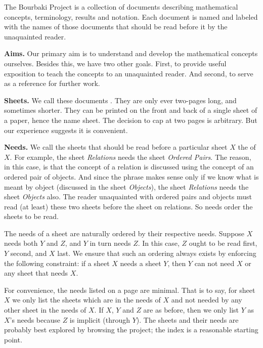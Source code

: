 
\sbasic

\sstart
{}

The Bourbaki Project is a collection
of documents describing mathematical
concepts, terminology, results and
notation. Each document is named and
labeled with the names of those documents
that should be read before it by the
unaquainted reader.

\textbf{Aims.}
Our primary aim is to understand and
develop the mathematical concepts ourselves.
Besides this, we have two other goals.
First, to provide useful exposition to teach
the concepts to an unaquainted reader.
And second, to serve as a reference for
further work.

\textbf{Sheets.}
We call these documents .
They are only ever two-pages long, and
sometimes shorter.
They can be printed on the front
and back of a single
sheet of a paper, hence the name sheet.
The decision to cap at two pages is
arbitrary.
But our
experience suggests it is convenient.


\textbf{Needs.}
We call the sheets that should
be read before a particular sheet
$X$ the  of $X$.
For example, the sheet \textit{Relations}
needs the sheet \textit{Ordered Pairs}.
The reason, in this case, is that the
concept of a relation is discussed using
the concept of an ordered pair of objects.
And since the phrase
 makes sense
only if we know what is meant by object
(discussed in the sheet \textit{Objects}),
the sheet \textit{Relations} needs the sheet
\textit{Objects} also.
The reader unaquainted with
ordered pairs and
objects must read (at least) these two
sheets before the sheet on relations.
So needs order the sheets to be read.

The needs of a sheet are naturally
ordered by their respective needs.
Suppose $X$ needs both $Y$ and $Z$,
and
 $Y$ in turn needs $Z$.
In this case,
$Z$ ought to
be read first, $Y$ second, and $X$ last.
We ensure that such an ordering
always exists by enforcing
the following constraint:
if a
sheet $X$ needs a sheet $Y$,
then $Y$ can not need $X$ or any sheet
that needs $X$.

For convenience, the needs listed on
a page are minimal. That is to say,
for sheet $X$ we only list the sheets
which are in the needs of $X$
and not needed by any other sheet
in the needs of $X$.
If $X$, $Y$ and $Z$ are as before,
then we only list $Y$ as $X$'s needs
because $Z$ is implicit (through $Y$).
The sheets and their needs are probably
best explored by browsing the project;
the index is
a reasonable starting point.

